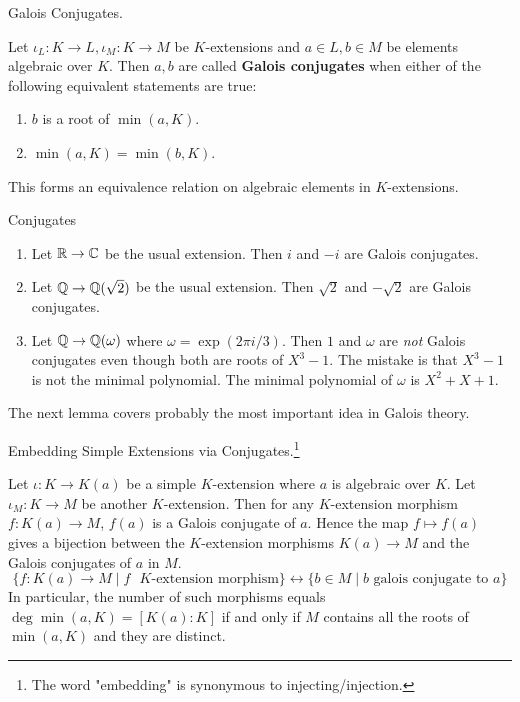 \documentclass[../book.tex]{subfiles}
\begin{document}
\begin{dfn} Galois Conjugates.

    Let $\iota_L : K \to L, \iota_M : K \to M$ be $K$-extensions and
    $a \in L, b \in M$ be elements algebraic over $K$. 
    Then $a, b$ are called \textbf{Galois conjugates} when
    either of the following equivalent statements are true: 
    \begin{enumerate}
        \item $b$ is a root of $\min(a,K)$.
        \item $\min(a,K) = \min(b,K)$.
    \end{enumerate}
    This forms an equivalence relation on algebraic elements in $K$-extensions.
\end{dfn}
\begin{eg} Conjugates
    \begin{enumerate}
        \item Let $\mathbb{R} \to \mathbb{C}$ be the usual extension.
        Then $i$ and $-i$ are Galois conjugates.
        \item Let $\mathbb{Q} \to \mathbb{Q}(\sqrt{2})$ be the usual extension.
        Then $\sqrt{2}$ and $-\sqrt{2}$ are Galois conjugates.
        \item Let $\mathbb{Q} \to \mathbb{Q}(\omega)$ where $\omega = \exp(2\pi i / 3)$.
        Then $1$ and $\omega$ are \emph{not} Galois conjugates even though
        both are roots of $X^3 - 1$. 
        The mistake is that $X^3 - 1$ is not the minimal polynomial.
        The minimal polynomial of $\omega$ is $X^2 + X + 1$. 
    \end{enumerate}
\end{eg}
\begin{rmk}
    The next lemma covers probably the most important idea in Galois theory.
\end{rmk}
\begin{lem} Embedding Simple Extensions via Conjugates.\footnote{
    The word "embedding" is synonymous to injecting/injection.}
    
    Let $\iota : K \to K(a)$ be a simple $K$-extension
    where $a$ is algebraic over $K$. 
    Let $\iota_M : K \to M$ be another $K$-extension.
    Then for any $K$-extension morphism $f : K(a) \to M$, 
    $f(a)$ is a Galois conjugate of $a$.
    Hence the map $f \mapsto f(a)$ gives a bijection between
    the $K$-extension morphisms $K(a) \to M$ and the Galois conjugates of $a$ in $M$.
    \[
        \{f : K(a) \to M \mid f \text{ $K$-extension morphism} \} \leftrightarrow 
        \{b \in M \mid b \text{ galois conjugate to } a \}
    \]
    In particular, the number of such morphisms equals $\deg \min(a,K) = [K(a) : K]$ 
    if and only if $M$ contains all the roots of $\min(a,K)$ and they are distinct. 
\end{lem}
\end{document}
